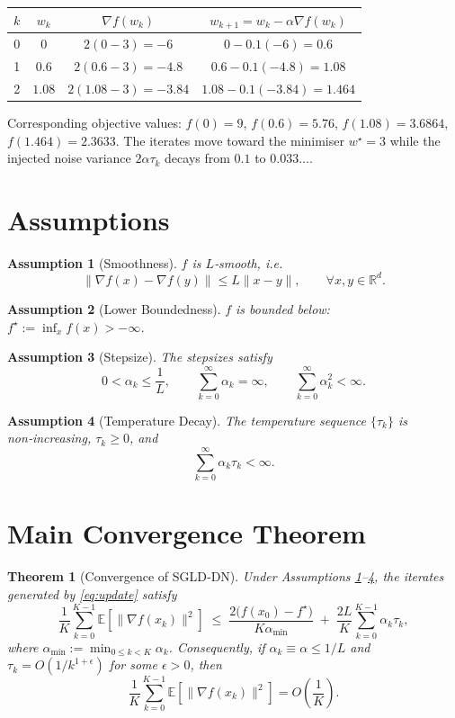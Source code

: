 \documentclass{article}
\newtheorem{theorem}{Theorem}
\newtheorem{assumption}{Assumption}
\newcommand{\E}{\mathbb{E}}
\newcommand{\R}{\mathbb{R}}
\begin{document}
\begin{center}
\begin{tabular}{c|c|c|c}
$k$ & $w_k$ & $\nabla f(w_k)$ & $w_{k+1}=w_k-\alpha\nabla f(w_k)$\\ \hline
0 & $0$ & $2(0-3)=-6$ & $0-0.1(-6)=0.6$\\
1 & $0.6$ & $2(0.6-3)=-4.8$ & $0.6-0.1(-4.8)=1.08$\\
2 & $1.08$ & $2(1.08-3)=-3.84$ & $1.08-0.1(-3.84)=1.464$\\
\end{tabular}
\end{center}
Corresponding objective values:
$f(0)=9$, $f(0.6)=5.76$, $f(1.08)=3.6864$, $f(1.464)=2.3633$.
The iterates move toward the minimiser $w^\star=3$ while the injected noise variance $2\alpha\tau_k$ decays from $0.1$ to $0.033\ldots$.

\section*{Assumptions}
\begin{assumption}[Smoothness]\label{ass:smooth}
$f$ is $L$‑smooth, i.e.
\[
\|\nabla f(x)-\nabla f(y)\|\le L\|x-y\|,\qquad\forall x,y\in\R^d .
\]
\end{assumption}
\begin{assumption}[Lower Boundedness]\label{ass:lb}
$f$ is bounded below: $f^\star:=\inf_{x}f(x)>-\infty$.
\end{assumption}
\begin{assumption}[Stepsize]\label{ass:stepsize}
The stepsizes satisfy
\[
0<\alpha_k\le \frac{1}{L},\qquad 
\sum_{k=0}^\infty \alpha_k = \infty,\qquad 
\sum_{k=0}^\infty \alpha_k^2 <\infty .
\]
\end{assumption}
\begin{assumption}[Temperature Decay]\label{ass:temp}
The temperature sequence $\{\tau_k\}$ is non‑increasing, $\tau_k\ge0$, and
\[
\sum_{k=0}^\infty \alpha_k \tau_k < \infty .
\]
\end{assumption}

\section*{Main Convergence Theorem}
\begin{theorem}[Convergence of SGLD‑DN]\label{thm:main}
Under Assumptions \ref{ass:smooth}–\ref{ass:temp}, the iterates generated by \eqref{eq:update} satisfy
\[
\frac{1}{K}\sum_{k=0}^{K-1}\E\!\left[\|\nabla f(x_k)\|^2\right]
\;\le\;
\frac{2\bigl(f(x_0)-f^\star\bigr)}{K\alpha_{\min}}
\;+\;
\frac{2L}{K}\sum_{k=0}^{K-1}\alpha_k \tau_k ,
\]
where $\alpha_{\min}:=\min_{0\le k<K}\alpha_k$.
Consequently, if $\alpha_k\equiv \alpha\le 1/L$ and $\tau_k=O(1/k^{1+\epsilon})$ for some $\epsilon>0$, then
\[
\frac{1}{K}\sum_{k=0}^{K-1}\E\!\left[\|\nabla f(x_k)\|^2\right]=O\!\left(\frac{1}{K}\right).
\]
\end{theorem}
\end{document}
